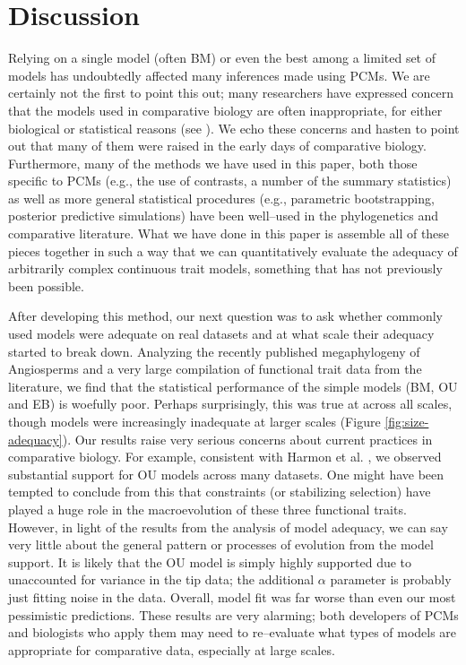 \documentclass[a4paper,12pt]{article}
\begin{document}
\section{Discussion}

Relying on a single model (often BM) or even the best among a limited set of models has undoubtedly affected many inferences made using PCMs. We are certainly not the first to point this out; many researchers have expressed concern that the models used in comparative biology are often inappropriate, for either biological or statistical reasons (see \citep{Felsenstein1985, Felsenstein1988, HarveyPagel1991, Garland1992, Pagel1993, Diaz1996, Price1997, Garland1999, GarlandIves2000, HansenOrzack2005, Hansen2012, Felsenstein2012, Boettiger2012, SlaterPennell}). We echo these concerns and hasten to point out that many of them were raised in the early days of comparative biology. Furthermore, many of the methods we have used in this paper, both those specific to PCMs (e.g., the use of contrasts, a number of the summary statistics) as well as more general statistical procedures (e.g., parametric bootstrapping, posterior predictive simulations) have been well--used in the phylogenetics and comparative literature. What we have done in this paper is assemble all of these pieces together in such a way that we can quantitatively evaluate the adequacy of arbitrarily complex continuous trait models, something that has not previously been possible. 

After developing this method, our next question was to ask whether commonly used models were adequate on real datasets and at what scale their adequacy started to break down. Analyzing the recently published megaphylogeny of Angiosperms \citep{Zanne2013} and a very large compilation of functional trait data from the literature, we find that the statistical performance of the simple models (BM, OU and EB) is woefully poor. Perhaps surprisingly, this was true at across all scales, though models were increasingly inadequate at larger scales (Figure \ref{fig:size-adequacy}). Our results raise very serious concerns about current practices in comparative biology. For example, consistent with Harmon et al. \citep{Harmon2010}, we observed substantial support for OU models across many datasets. One might have been tempted to conclude from this that constraints (or stabilizing selection) have played a huge role in the macroevolution of these three functional traits. However, in light of the results from the analysis of model adequacy, we can say very little about the general pattern or processes of evolution from the model support. It is likely that the OU model is simply highly supported due to unaccounted for variance in the tip data; the additional $\alpha$ parameter is probably just fitting noise in the data. Overall, model fit was far worse than even our most pessimistic predictions. These results are very alarming; both developers of PCMs and biologists who apply them may need to re--evaluate what types of models are appropriate for comparative data, especially at large scales. 
\end{document}
